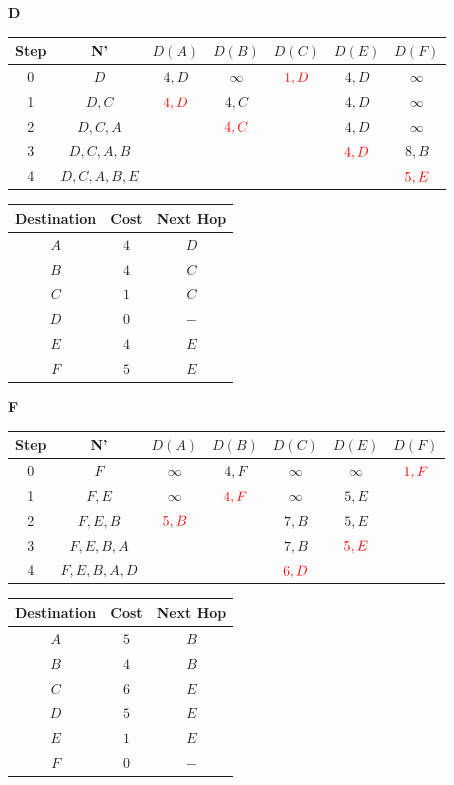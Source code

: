 \documentclass[10pt]{article}
\begin{document}
	\begin{center}
	 	\textbf{D}
 		\begin{tabular}{||c c c c c c c||} 
 			\hline
 			Step & N' & $D(A)$ & $D(B)$ & $D(C)$ & $D(E)$ & $D(F)$ \\[0.5ex] 
 			\hline\hline
 			0 & $D$ & $4,D$ & $\infty$ & $\color{red} 1,D$ & $4,D$ & $\infty$ \\
 			\hline
 			1 & $D,C$ & $\color{red} 4,D$ & $4,C$ & & $4,D$ & $\infty$ \\
 			\hline
 			2 & $D,C,A$ & & $\color{red} 4,C$ & & $4,D$ & $\infty$ \\
 			\hline
 			3 & $D,C,A,B$ & & & & $\color{red} 4,D$ & $8,B$ \\
 			\hline
 			4 & $D,C,A,B,E$ & & & & & $\color{red} 5,E$ \\[0.5ex]  
 			\hline
		\end{tabular}
		\quad
		\begin{tabular}{||c || c || c||}
			\hline
 			Destination & Cost & Next Hop\\[0.5ex] 
 			\hline\hline
			$A$ & $4$ & $D$\\
			$B$ & $4$ & $C$\\
 			$C$ & $1$ & $C$\\
			$D$ & $0$ & $-$\\
			$E$ & $4$ & $E$\\
			$F$ & $5$ & $E$\\[0.5ex]
			\hline
		\end{tabular}
	\end{center}
	
	\begin{center}
	 	\textbf{F}
 		\begin{tabular}{||c c c c c c c||} 
 			\hline
 			Step & N' & $D(A)$ & $D(B)$ & $D(C)$ & $D(E)$ & $D(F)$ \\[0.5ex] 
 			\hline\hline
 			0 & $F$ & $\infty$ & $4,F$ & $\infty$ & $\infty$ & $\color{red} 1,F$ \\
 			\hline
 			1 & $F,E$ & $\infty$ & $\color{red} 4,F$ & $\infty$ & $5,E$  & \\
 			\hline
 			2 & $F,E,B$ & $\color{red} 5,B$ & & $7,B$ & $5,E$ & \\
 			\hline
 			3 & $F,E,B,A$ & & & $7,B$ & $\color{red} 5,E$ & \\
 			\hline
 			4 & $F,E,B,A,D$ & & & $\color{red} 6,D$ & &\\[0.5ex]  
 			\hline
		\end{tabular}
		\quad
		\begin{tabular}{||c || c || c||}
			\hline
 			Destination & Cost & Next Hop\\[0.5ex] 
 			\hline\hline
			$A$ & $5$ & $B$\\
			$B$ & $4$ & $B$\\
 			$C$ & $6$ & $E$\\
			$D$ & $5$ & $E$\\
			$E$ & $1$ & $E$\\
			$F$ & $0$ & $-$\\[0.5ex]
			\hline
		\end{tabular}
	\end{center}
	
\end{document}
